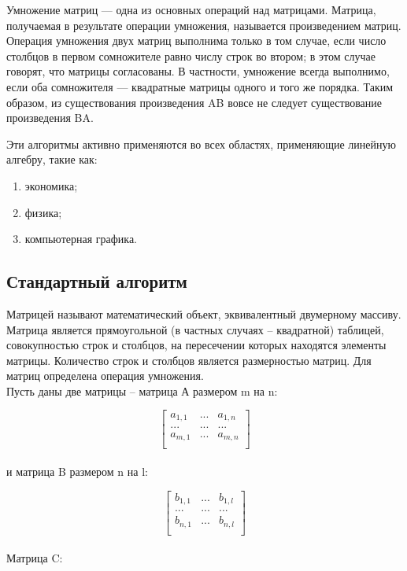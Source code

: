 \documentclass[a4paper, 14pt]{article}
\begin{document}
	Умножение матриц — одна из основных операций над матрицами. Матрица, получаемая в результате операции умножения, называется произведением матриц. Операция умножения двух матриц выполнима только в том случае, если число столбцов в первом сомножителе равно числу строк во втором; в этом случае говорят, что матрицы согласованы. В частности, умножение всегда выполнимо, если оба сомножителя — квадратные матрицы одного и того же порядка. Таким образом, из существования произведения AB вовсе не следует существование произведения BA.

Эти алгоритмы активно применяются во всех областях, применяющие линейную алгебру, такие как:
\begin{enumerate}
	\item экономика;
	\item физика;
	\item компьютерная графика.
\end{enumerate}

	
	\subsection{Стандартный алгоритм}
	Матрицей называют математический объект, эквивалентный двумерному массиву. Матрица является прямоугольной (в частных случаях – квадратной) таблицей, совокупностью строк и столбцов, на пересечении которых находятся элементы матрицы. Количество строк и столбцов является размерностью матриц. Для матриц определена операция умножения.\\
	
	Пусть даны две матрицы – матрица А размером m на n:

\[ \begin{bmatrix}
a_{1,1} & ... & a_{1,n} \\
... & ... & ... \\
a_{m,1} & ... & a_{m,n} \\
\end{bmatrix} \]\\
	
	и матрица B размером n на l:

\[ \begin{bmatrix}
b_{1,1} & ... & b_{1,l} \\
... & ... & ... \\
b_{n,1} & ... & b_{n,l} \\
\end{bmatrix} \]\\

	Матрица C:
	
\end{document}
